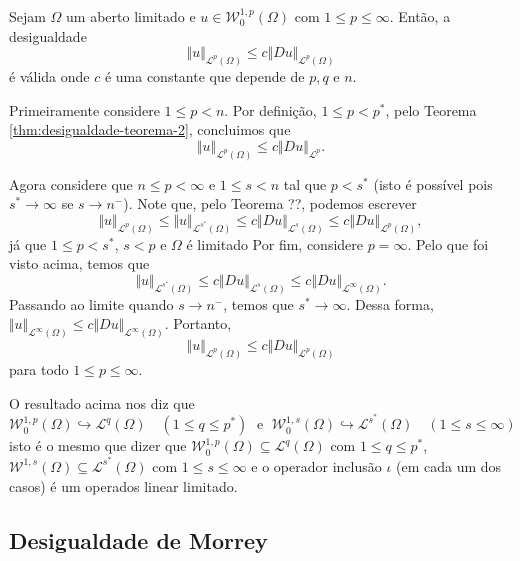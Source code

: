 \documentclass[a4paper, 11pt]{book}
\theoremstyle{definition}
\newcommand{\cL}{\mathcal{L}}
\newcommand{\cW}{\mathcal{W}}
\begin{document}
\begin{cbox}
   Sejam $\Omega$ um aberto limitado e $u \in \cW^{1,p}_0(\Omega)$ com $1 \leqslant p \leqslant \infty$. Então, a desigualdade
   \[
        \Vert u \Vert_{\cL^p(\Omega)} \leqslant c\Vert Du \Vert_{\cL^p(\Omega)}
   \]
   é válida
   onde $c$ é uma constante que depende de $p, q$ e $n$.
\end{cbox}
\begin{prf}
    Primeiramente considere $1 \leqslant p < n$.
    Por definição, $1 \leqslant p < p^*$, pelo Teorema \ref{thm:desigualdade-teorema-2}, concluimos que
    \[
        \Vert u \Vert_{\cL^p(\Omega)} \leqslant c \Vert Du \Vert_{\cL^p}.
    \]

    Agora considere que $n \leqslant p < \infty$ e $1 \leqslant s < n$ tal que $p < s^*$ (isto é possível pois $s^* \to \infty$ se $s \to n^-$).
    Note que, pelo Teorema ??, podemos escrever
    \[
        \Vert u \Vert_{\cL^p(\Omega)} \leqslant \Vert u \Vert_{\cL^{s^*}(\Omega)} \leqslant c \Vert Du \Vert_{\cL^s(\Omega)} \leqslant c \Vert Du \Vert_{\cL^p(\Omega)},
    \]
    já que $1 \leqslant p < s^*$, $s < p$ e $\Omega$ é limitado
    Por fim, considere $p = \infty$.
    Pelo que foi visto acima, temos que
    \[
        \Vert u \Vert_{\cL^{s^*}(\Omega)} \leqslant c \Vert Du \Vert_{\cL^{s}(\Omega)} \leqslant c \Vert Du \Vert_{\cL^\infty(\Omega)}.
    \]
    Passando ao limite quando $s \to n^-$, temos que $s^* \to \infty$. Dessa forma, $\Vert u \Vert_{\cL^\infty(\Omega)} \leqslant c \Vert Du \Vert_{\cL^\infty(\Omega)}$.
    Portanto,
    \[
        \Vert u \Vert_{\cL^p(\Omega)} \leqslant c\Vert Du \Vert_{\cL^p(\Omega)}
    \]
    para todo $1 \leqslant p \leqslant \infty$.
\end{prf}

O resultado acima nos diz que
\[
    \cW^{1,p}_0(\Omega) \hookrightarrow \cL^q(\Omega) \quad (1 \leqslant q \leqslant p^*) \;\text{ e }\; \cW^{1,s}_0(\Omega) \hookrightarrow \cL^{s^*}(\Omega) \quad (1 \leqslant s \leqslant \infty)
\]
isto é o mesmo que dizer que $\cW^{1,p}_0(\Omega) \subseteq \cL^q(\Omega)$ com $1 \leqslant q \leqslant p^*$, $\cW^{1,s}(\Omega) \subseteq \cL^{s^*}(\Omega)$ com $1 \leqslant s \leqslant \infty$ e o operador inclusão $\iota$ (em cada um dos casos) é um operados linear limitado.

\subsection{Desigualdade de Morrey}
\end{document}
